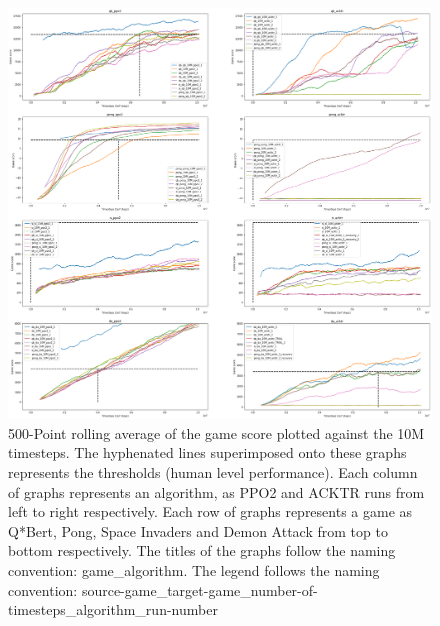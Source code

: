 \begin{figure}
	\includegraphics[width=\textwidth]{fig7.png} 
	\caption{500-Point rolling average of the game score plotted against the 10M timesteps. The hyphenated lines superimposed onto these graphs represents the thresholds (human level performance). Each column of graphs represents an algorithm, as PPO2 and ACKTR runs from left to right respectively. Each row of graphs represents a game as Q*Bert, Pong, Space Invaders and Demon Attack from top to bottom respectively. The titles of the graphs follow the naming convention: game\_algorithm. The legend follows the naming convention: source-game\_target-game\_number-of-timesteps\_algorithm\_run-number}
\end{figure}

